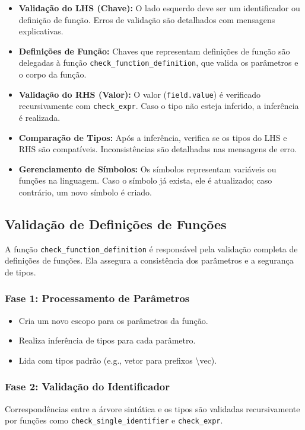 \begin{itemize}
  \item \textbf{Validação do LHS (Chave):}  
  O lado esquerdo deve ser um identificador ou definição de função. Erros de validação são detalhados com mensagens explicativas.

  \item \textbf{Definições de Função:}  
  Chaves que representam definições de função são delegadas à função \texttt{check\_function\_definition}, que valida os parâmetros e o corpo da função.

  \item \textbf{Validação do RHS (Valor):}  
  O valor (\texttt{field.value}) é verificado recursivamente com \texttt{check\_expr}. Caso o tipo não esteja inferido, a inferência é realizada.

  \item \textbf{Comparação de Tipos:}  
  Após a inferência, verifica se os tipos do LHS e RHS são compatíveis. Inconsistências são detalhadas nas mensagens de erro.

  \item \textbf{Gerenciamento de Símbolos:}  
  Os símbolos representam variáveis ou funções na linguagem. Caso o símbolo já exista, ele é atualizado; caso contrário, um novo símbolo é criado.
\end{itemize}

\subsection*{Validação de Definições de Funções}

A função \texttt{check\_function\_definition} é responsável pela validação completa de definições de funções. Ela assegura a consistência dos parâmetros e a segurança de tipos.

\subsubsection*{Fase 1: Processamento de Parâmetros}
\begin{itemize}
  \item Cria um novo escopo para os parâmetros da função.
  \item Realiza inferência de tipos para cada parâmetro.
  \item Lida com tipos padrão (e.g., vetor para prefixos \textbackslash{}vec).
\end{itemize}

\subsubsection*{Fase 2: Validação do Identificador}
Correspondências entre a árvore sintática e os tipos são validadas recursivamente por funções como \texttt{check\_single\_identifier} e \texttt{check\_expr}.

